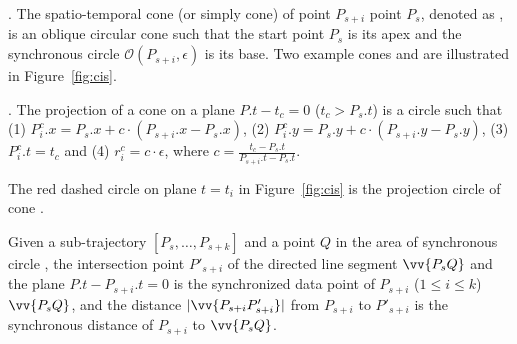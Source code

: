 

. The spatio-temporal cone (or simply cone) of point $P_{s+i}$ \wrt point $P_s$, denoted as , is an oblique circular cone such that the start point $P_s$ is its apex and the synchronous circle $\mathcal{O}(P_{s+i}, \epsilon)$ is its base.
%
Two example cones  and  are illustrated in Figure~\ref{fig:cis}.

. The projection of a cone  on a plane $P.t- t_c = 0$ ($t_c > P_s.t$) is a circle  such that
%
(1) $P^c_i.x = P_s.x +  c\cdot(P_{s+i}.x- P_{s}.x)$,
%
(2) $P^c_i.y = P_s.y +  c\cdot(P_{s+i}.y- P_{s}.y)$,
%
(3) $P^c_i.t = t_c$ and
%
(4) $r^c_i =c\cdot\epsilon$, where $c=\frac{t_c - P_s.t}{P_{s+i}.t - P_s.t}$.


The red dashed circle  on plane $t=t_i$ in Figure~\ref{fig:cis} is the projection circle of cone .







\begin{prop}
\label{prop-3d-syn-point}
Given a sub-trajectory $[P_s, \ldots, P_{s+k}]$ and a point $Q$ in the area of synchronous circle , the intersection point $P'_{s+i}$ of the directed line segment $\vv{P_sQ}$ and the plane $P.t - P_{s+i}.t = 0$ is the synchronized data point of $P_{s+i}$ ($1\le i\le k$) \wrt  $\vv{P_sQ}$, and the distance $|\vv{P_{s+i}P'_{s+i}}|$ from $P_{s+i}$ to $P'_{s+i}$ is the synchronous distance of $P_{s+i}$ to $\vv{P_sQ}$.
\end{prop}

